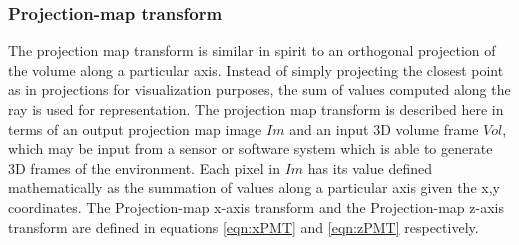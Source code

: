 \subsubsection{Projection-map transform}
\label{sec:PMTramsform}

The projection map transform is similar in spirit to an orthogonal projection of the volume along a particular axis. Instead of simply projecting the closest point as in projections for visualization purposes, the sum of values computed along the ray is used for representation. The projection map transform is described here in terms of an output projection map image $Im$ and an input 3D volume frame $Vol$, which may be input from a sensor or software system which is able to generate 3D frames of the environment. Each pixel in $Im$ has its value defined mathematically as the summation of values along a particular axis given the x,y coordinates. The Projection-map x-axis transform and the Projection-map z-axis transform are defined in equations \ref{eqn:xPMT} and \ref{eqn:zPMT} respectively. \\


